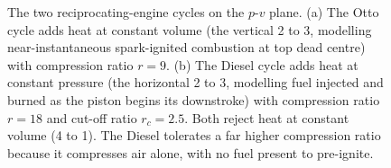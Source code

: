 \begin{figure}[htbp]
\caption[Otto and Diesel cycles on the pressure-volume plane]{The two
reciprocating-engine cycles on the $p$-$v$ plane. (a) The Otto cycle adds heat
at constant volume (the vertical 2 to 3, modelling near-instantaneous
spark-ignited combustion at top dead centre) with compression ratio $r = 9$.
(b) The Diesel cycle adds heat at constant pressure (the horizontal 2 to 3,
modelling fuel injected and burned as the piston begins its downstroke) with
compression ratio $r = 18$ and cut-off ratio $r_c = 2.5$. Both reject heat at
constant volume (4 to 1). The Diesel tolerates a far higher compression ratio
because it compresses air alone, with no fuel present to pre-ignite.}
\label{fig:vol04ch03:otto-diesel-pv}
\end{figure}
